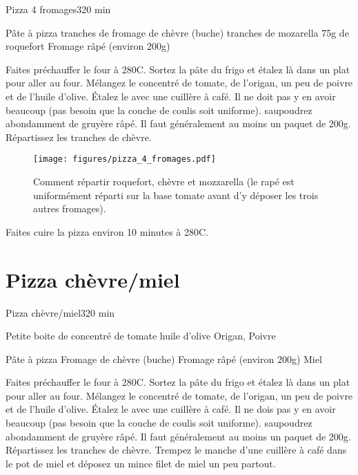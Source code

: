 {\begin{recette}{Pizza 4 fromages}{3}{}{20 min}
\begin{ingredients}
\ingredient Pâte à pizza
 tranches de fromage de chèvre (buche)
 tranches de mozarella
\ingredient 75g de roquefort
\ingredient Fromage râpé (environ 200g)
\end{ingredients}

\begin{preparation}
\etape Faites préchauffer le four à 280\degres C.
\etape Sortez la pâte du frigo et étalez là dans un plat pour aller au four.
\etape Mélangez le concentré de tomate, de l'origan, un peu de poivre et de l'huile d'olive.
\etape Étalez le avec une cuillère à café. Il ne doit pas y en avoir beaucoup (pas besoin que la couche de coulis soit 
uniforme).
\etape saupoudrez abondamment de gruyère râpé. Il faut généralement au moins un paquet de 200g. 
\etape Répartissez les tranches de chèvre. 
\begin{figure}[htb]
\centering
\texttt{[image: figures/pizza\_4\_fromages.pdf]}
\caption{Comment répartir roquefort, chèvre et mozzarella (le rapé est uniformément réparti sur la base tomate avant d'y déposer les trois autres fromages).}
\end{figure}
\end{preparation}

\begin{cuisson}
Faites cuire la pizza environ 10 minutes à 280\degres C.
\end{cuisson}
\end{recette}

\section{Pizza chèvre/miel}
\begin{recette}{Pizza chèvre/miel}{3}{}{20 min}

\begin{ingredients}
\ingredient Petite boite de concentré de tomate
\ingredient huile d'olive
\ingredient Origan, Poivre

\ingredient Pâte à pizza
\ingredient Fromage de chèvre (buche)
\ingredient Fromage râpé (environ 200g)
\ingredient Miel
\end{ingredients}

\begin{preparation}
\etape Faites préchauffer le four à 280\degres C.
\etape Sortez la pâte du frigo et étalez là dans un plat pour aller au four.
\etape Mélangez le concentré de tomate, de l'origan, un peu de poivre et de l'huile d'olive.
\etape Étalez le avec une cuillère à café. Il ne dois pas y en avoir beaucoup (pas besoin que la couche de coulis soit 
uniforme).
\etape saupoudrez abondamment de gruyère râpé. Il faut généralement au moins un paquet de 200g. 
\etape Répartissez les tranches de chèvre. 
\etape Trempez le manche d'une cuillère à café dans le pot de miel et déposez un mince filet de miel un peu partout.
\end{preparation}


\end{recette}}
